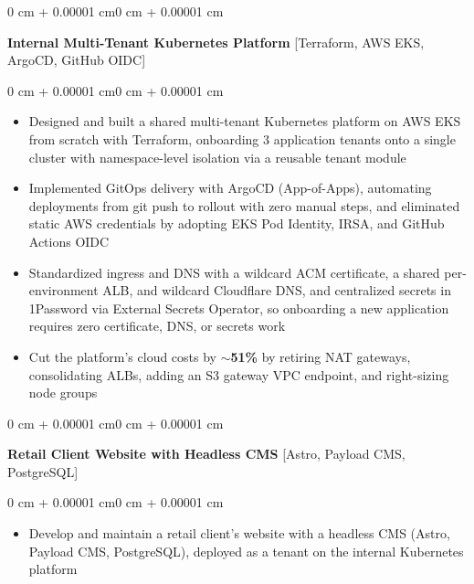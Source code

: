 \documentclass[10pt, letterpaper]{article}
\newenvironment{highlights}{
    \begin{itemize}[
        topsep=0.06 cm,
        parsep=0.06 cm,
        partopsep=0pt,
        itemsep=0pt,
        leftmargin=0.4 cm + 10pt
    ]
}{
    \end{itemize}
}
\newenvironment{onecolentry}{
    \begin{adjustwidth}{0 cm + 0.00001 cm}{0 cm + 0.00001 cm}
}{
    \end{adjustwidth}
}
\begin{document}
        \vspace{0.10 cm}
        \begin{onecolentry}
            \textbf{Internal Multi-Tenant Kubernetes Platform} [Terraform, AWS EKS, ArgoCD, GitHub OIDC]
        \end{onecolentry}

        \vspace{0.10 cm}
        \begin{onecolentry}
            \begin{highlights}
                \item Designed and built a shared multi-tenant Kubernetes platform on AWS EKS from scratch with Terraform, onboarding 3 application tenants onto a single cluster with namespace-level isolation via a reusable tenant module
                \item Implemented GitOps delivery with ArgoCD (App-of-Apps), automating deployments from git push to rollout with zero manual steps, and eliminated static AWS credentials by adopting EKS Pod Identity, IRSA, and GitHub Actions OIDC
                \item Standardized ingress and DNS with a wildcard ACM certificate, a shared per-environment ALB, and wildcard Cloudflare DNS, and centralized secrets in 1Password via External Secrets Operator, so onboarding a new application requires zero certificate, DNS, or secrets work
                \item Cut the platform's cloud costs by \textbf{$\sim$51\%} by retiring NAT gateways, consolidating ALBs, adding an S3 gateway VPC endpoint, and right-sizing node groups
            \end{highlights}
        \end{onecolentry}

        \vspace{0.22 cm}
        \begin{onecolentry}
            \textbf{Retail Client Website with Headless CMS} [Astro, Payload CMS, PostgreSQL]
        \end{onecolentry}

        \vspace{0.10 cm}
        \begin{onecolentry}
            \begin{highlights}
                \item Develop and maintain a retail client's website with a headless CMS (Astro, Payload CMS, PostgreSQL), deployed as a tenant on the internal Kubernetes platform
            \end{highlights}
        \end{onecolentry}
\end{document}
